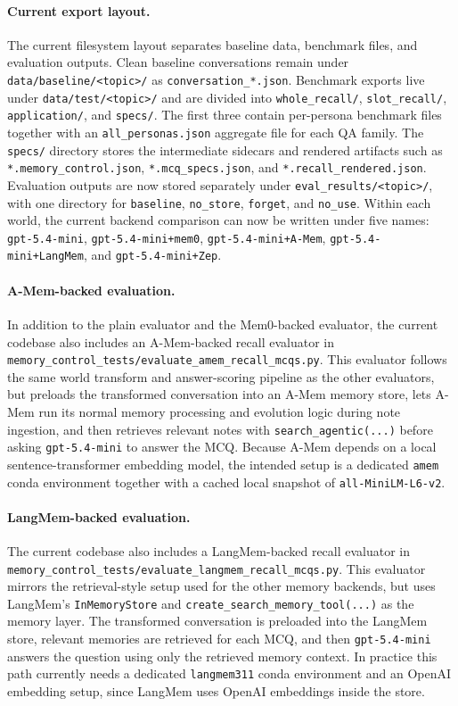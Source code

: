 \paragraph{Current export layout.}
The current filesystem layout separates baseline data, benchmark files, and evaluation outputs. Clean baseline conversations remain under \texttt{data/baseline/<topic>/} as \texttt{conversation\_*.json}. Benchmark exports live under \texttt{data/test/<topic>/} and are divided into \texttt{whole\_recall/}, \texttt{slot\_recall/}, \texttt{application/}, and \texttt{specs/}. The first three contain per-persona benchmark files together with an \texttt{all\_personas.json} aggregate file for each QA family. The \texttt{specs/} directory stores the intermediate sidecars and rendered artifacts such as \texttt{*.memory\_control.json}, \texttt{*.mcq\_specs.json}, and \texttt{*.recall\_rendered.json}. Evaluation outputs are now stored separately under \texttt{eval\_results/<topic>/}, with one directory for \texttt{baseline}, \texttt{no\_store}, \texttt{forget}, and \texttt{no\_use}. Within each world, the current backend comparison can now be written under five names: \texttt{gpt-5.4-mini}, \texttt{gpt-5.4-mini+mem0}, \texttt{gpt-5.4-mini+A-Mem}, \texttt{gpt-5.4-mini+LangMem}, and \texttt{gpt-5.4-mini+Zep}.

\paragraph{A-Mem-backed evaluation.}
In addition to the plain evaluator and the Mem0-backed evaluator, the current codebase also includes an A-Mem-backed recall evaluator in \texttt{memory\_control\_tests/evaluate\_amem\_recall\_mcqs.py}. This evaluator follows the same world transform and answer-scoring pipeline as the other evaluators, but preloads the transformed conversation into an A-Mem memory store, lets A-Mem run its normal memory processing and evolution logic during note ingestion, and then retrieves relevant notes with \texttt{search\_agentic(...)} before asking \texttt{gpt-5.4-mini} to answer the MCQ. Because A-Mem depends on a local sentence-transformer embedding model, the intended setup is a dedicated \texttt{amem} conda environment together with a cached local snapshot of \texttt{all-MiniLM-L6-v2}.

\paragraph{LangMem-backed evaluation.}
The current codebase also includes a LangMem-backed recall evaluator in \texttt{memory\_control\_tests/evaluate\_langmem\_recall\_mcqs.py}. This evaluator mirrors the retrieval-style setup used for the other memory backends, but uses LangMem's \texttt{InMemoryStore} and \texttt{create\_search\_memory\_tool(...)} as the memory layer. The transformed conversation is preloaded into the LangMem store, relevant memories are retrieved for each MCQ, and then \texttt{gpt-5.4-mini} answers the question using only the retrieved memory context. In practice this path currently needs a dedicated \texttt{langmem311} conda environment and an OpenAI embedding setup, since LangMem uses OpenAI embeddings inside the store.

